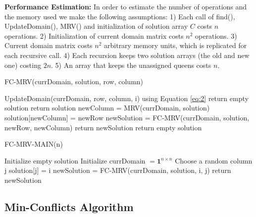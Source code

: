 \textbf{Performance Estimation:} In order to estimate the number of operations and the memory used we make the following assumptions: 1) Each call of find(), UpdateDomain(), MRV() and initialization of solution array $C$ costs $n$ operations. 2) Initialization of current domain matrix costs $n^2$ operations. 3) Current domain matrix costs $n^2$ arbitrary memory units, which is replicated for each recursive call. 4) Each recursion keeps two solution arrays (the old and new one) costing $2n$. 5) An array that keeps the unassigned queens costs $n$.

\begin{algorithm}
\caption{FC-MRV(currDomain, solution, row, column)}\label{alg:fc-mrv}
\begin{algorithmic}[1]
\State UpdateDomain(currDomain, row, column, i) using Equation \ref{eq:2}
return empty solution
\EndIf
\EndFor
{}
return solution
\EndIf
\State newColumn = MRV(currDomain, solution)
\State solution[newColumn] = newRow
\State newSolution = FC-MRV(currDomain, solution, newRow, newColumn) 
return newSolution
\EndIf
\EndFor
\State return empty solution
\end{algorithmic}
\end{algorithm}

\begin{algorithm}
\caption{FC-MRV-MAIN(n)}\label{alg:fc-mrv-main}
\begin{algorithmic}[1]
\State Initialize empty solution
\State Initialize currDomain $ = \boldsymbol{1}^{n\times n}$
\State Choose a random column j
\State solution[j] = i
\State newSolution = FC-MRV(currDomain, solution, i, j) 
return newSolution
\EndIf
\EndFor
\end{algorithmic}
\end{algorithm}



\subsection{Min-Conflicts Algorithm}

